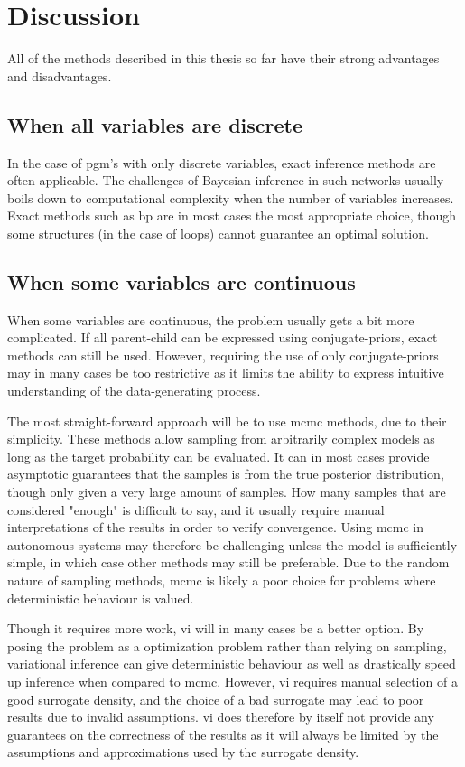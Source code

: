 \chapter{Discussion}

All of the methods described in this thesis so far have their strong advantages and disadvantages. 

\section{When all variables are discrete}
In the case of \acrshort{pgm}'s with only discrete variables, exact inference methods are often applicable. The challenges of Bayesian inference in such networks usually boils down to computational complexity when the number of variables increases. Exact methods such as \acrshort{bp} are in most cases the most appropriate choice, though some structures (in the case of loops) cannot guarantee an optimal solution. 

\section{When some variables are continuous}
When some variables are continuous, the problem usually gets a bit more complicated. If all parent-child can be expressed using conjugate-priors, exact methods can still be used. However, requiring the use of only conjugate-priors may in many cases be too restrictive as it limits the ability to express intuitive understanding of the data-generating process. 

The most straight-forward approach will be to use \acrshort{mcmc} methods, due to their simplicity. These methods allow sampling from arbitrarily complex models as long as the target probability can be evaluated. It can in most cases provide asymptotic guarantees that the samples is from the true posterior distribution, though only given a very large amount of samples. How many samples that are considered "enough" is difficult to say, and it usually require manual interpretations of the results in order to verify convergence. Using \acrshort{mcmc} in autonomous systems may therefore be challenging unless the model is sufficiently simple, in which case other methods may still be preferable. Due to the random nature of sampling methods, \acrshort{mcmc} is likely a poor choice for problems where deterministic behaviour is valued.



Though it requires more work, \acrshort{vi} will in many cases be a better option. By posing the problem as a optimization problem rather than relying on sampling, variational inference can give deterministic behaviour as well as drastically speed up inference when compared to \acrshort{mcmc}. However, \acrshort{vi} requires manual selection of a good surrogate density, and the choice of a bad surrogate may lead to poor results due to invalid assumptions. \acrshort{vi} does therefore by itself not provide any guarantees on the correctness of the results as it will always be limited by the assumptions and approximations used by the surrogate density.

